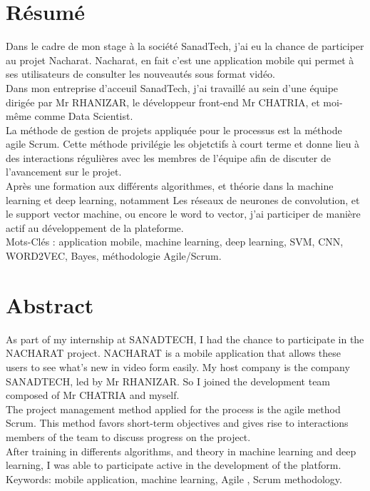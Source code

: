 \documentclass[11pt, oneside]{Thesis} %
\begin{document}
\chapter*{Résumé}
Dans le cadre de mon stage à la société SanadTech, j'ai eu la chance de participer au projet Nacharat. Nacharat, en fait c'est une application mobile qui permet à ses utilisateurs de consulter les nouveautés sous format vidéo.\\
Dans mon entreprise d'acceuil SanadTech, j'ai travaillé au sein d'une équipe dirigée par Mr RHANIZAR, le développeur front-end Mr CHATRIA, et moi-même comme Data Scientist.\\
La méthode de gestion de projets appliquée pour le processus est la méthode agile Scrum. Cette méthode privilégie les objetctifs à court terme et donne lieu à des interactions régulières avec les membres de l'équipe afin de discuter de l'avancement sur le projet.\\
Après une formation aux différents algorithmes, et théorie dans la machine learning et deep learning, notamment Les réseaux de neurones de convolution, et le support vector machine, ou encore le word to vector, j'ai participer de manière actif au développement de la plateforme.\\[1cm]

Mots-Clés : application mobile, machine learning, deep learning, SVM, CNN, WORD2VEC, Bayes, méthodologie Agile/Scrum.



%

\clearpage %

\clearpage %
\chapter*{Abstract}
As part of my internship at SANADTECH, I had the chance to participate in the NACHARAT project. NACHARAT is a mobile application that allows these users to see what’s new in video form easily. My host company is the company SANADTECH, led by Mr RHANIZAR. So I joined the development team composed of Mr CHATRIA and myself.\\
The project management method applied for the process is the agile method Scrum. This method favors short-term objectives and gives rise to interactions members of the team to discuss progress on the project.\\[0.2cm]
After training in differents algorithms, and theory in machine learning and deep learning, I was able to participate active in the development of the platform.\\[1cm]
Keywords: mobile application, machine learning, Agile , Scrum methodology.
\end{document}
